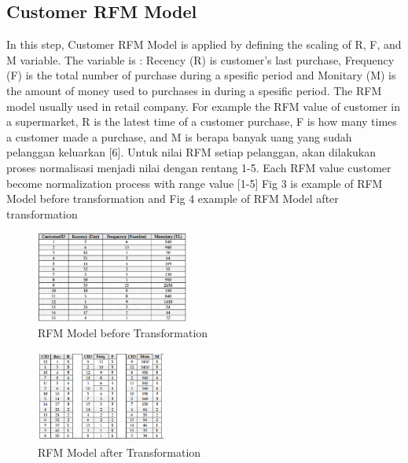 \documentclass[conference]{IEEEtran}
\begin{document}
\subsection{Customer RFM Model}
In this step, Customer RFM Model is applied by defining the scaling of R, F, and M variable. The
variable is : Recency (R) is customer's last purchase,
Frequency (F) is the total number of purchase during a spesific
period and Monitary (M) is the amount of money used to
purchases in during a spesific period. The RFM model usually
used in retail company. For example the RFM value of
customer in a supermarket, R is the latest time of a customer
purchase, F is how many times a customer made a purchase, and M is berapa banyak uang yang sudah pelanggan keluarkan [6]. Untuk nilai RFM setiap pelanggan, akan dilakukan proses normalisasi menjadi nilai dengan rentang 1-5. Each RFM value customer become normalization process with range value [1-5] Fig 3 is example of RFM Model before transformation and Fig 4 example of RFM Model after transformation

\begin{figure}[h]
\centering
\includegraphics[width=\columnwidth, height=3cm,keepaspectratio]{figure/rfm_model}
\caption{RFM Model before Transformation}
\label{rfm_model}
\end{figure}

\begin{figure}[h]
\centering
\includegraphics[width=\columnwidth, height=3cm,keepaspectratio]{figure/rfm_model_after}
\caption{RFM Model after Transformation}
\label{rfm_model_after}
\end{figure}
\end{document}
